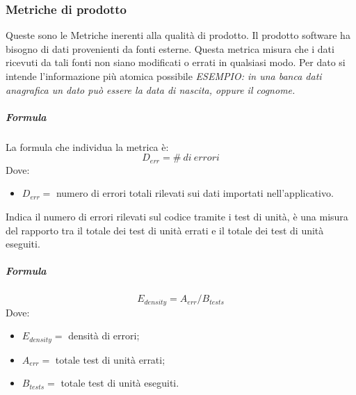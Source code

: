         \subsubsection{Metriche di prodotto}
        Queste sono le Metriche inerenti alla qualità di prodotto.
        Il prodotto software ha bisogno di dati provenienti da fonti esterne. Questa 
        metrica misura che i dati ricevuti da tali fonti non siano modificati o errati 
        in qualsiasi modo. Per dato si intende l'informazione più atomica possibile
        \textit{ESEMPIO: in una banca dati anagrafica un dato può essere la data di 
        nascita, oppure il cognome.}
        \subparagraph{Formula}
        La formula che individua la metrica è:
        \begin{displaymath}
          D_{err} = \#\ di\ errori
        \end{displaymath}
        Dove:
        \begin{itemize}
        \item[]$D_{err} =$  numero di errori totali rilevati sui dati importati 
        nell'applicativo.
        \end{itemize}
        Indica il numero di errori rilevati sul codice tramite i test di unità, è una 
        misura del rapporto tra il totale dei test di unità errati e il totale dei test 
        di unità eseguiti.
        \subparagraph{Formula}
        \begin{displaymath}
          E_{density} = A_{err}/B_{tests}
        \end{displaymath}
        Dove:
        \begin{itemize}
          \item[] $E_{density} =$ densità di errori;
          \item[] $A_{err} =$ totale test di unità errati;  
          \item[] $B_{tests} =$ totale test di unità eseguiti.
        \end{itemize}
        
